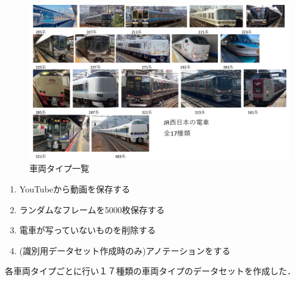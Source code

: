 \usepackage{subcaption}
\usepackage{comment}



\maketitle %
\addtocounter{page}{1}
\thispagestyle{myfirstpage}

\begin{figure}
	\centering
	\includegraphics[width=0.6\linewidth]{fig/densya0202.png}
	\caption{車両タイプ一覧}
	\label{fig:densya0202}
\end{figure}





\begin{enumerate}
	\item YouTubeから動画を保存する
	\item ランダムなフレームを5000枚保存する
	\item 電車が写っていないものを削除する
	\item  (識別用データセット作成時のみ)アノテーションをする
\end{enumerate}
各車両タイプごとに行い１７種類の車両タイプのデータセットを作成した．

